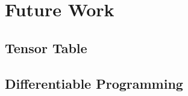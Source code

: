 \documentclass[10pt,a4paper%
]{article}
\begin{document}
\section{Future Work}
\subsection{Tensor Table}
\subsection{Differentiable Programming}
\cite{dremel}
\cite{numpywren}
\cite{rdd}
\cite{towards-scalable-dataframe-systems}

\nocite{*}
\printbibliography
\end{document}
